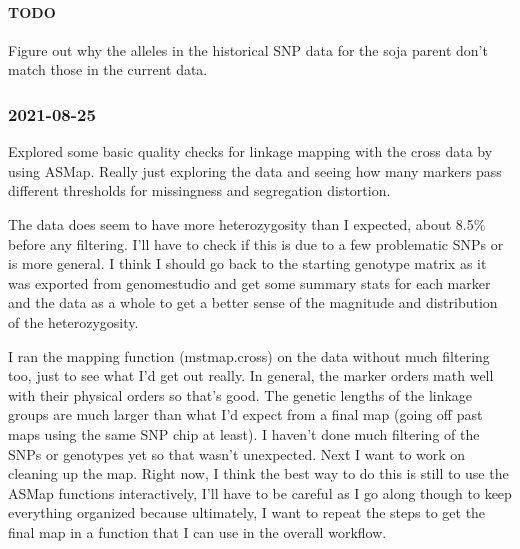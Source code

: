 \documentclass[
]{article}
\begin{document}
\hypertarget{todo}{%
\paragraph{TODO}\label{todo}}

Figure out why the alleles in the historical SNP data for the soja
parent don't match those in the current data.

\hypertarget{section}{%
\subsubsection{2021-08-25}\label{section}}

Explored some basic quality checks for linkage mapping with the cross
data by using ASMap. Really just exploring the data and seeing how many
markers pass different thresholds for missingness and segregation
distortion.

The data does seem to have more heterozygosity than I expected, about
8.5\% before any filtering. I'll have to check if this is due to a few
problematic SNPs or is more general. I think I should go back to the
starting genotype matrix as it was exported from genomestudio and get
some summary stats for each marker and the data as a whole to get a
better sense of the magnitude and distribution of the heterozygosity.

I ran the mapping function (mstmap.cross) on the data without much
filtering too, just to see what I'd get out really. In general, the
marker orders math well with their physical orders so that's good. The
genetic lengths of the linkage groups are much larger than what I'd
expect from a final map (going off past maps using the same SNP chip at
least). I haven't done much filtering of the SNPs or genotypes yet so
that wasn't unexpected. Next I want to work on cleaning up the map.
Right now, I think the best way to do this is still to use the ASMap
functions interactively, I'll have to be careful as I go along though to
keep everything organized because ultimately, I want to repeat the steps
to get the final map in a function that I can use in the overall
workflow.
\end{document}
